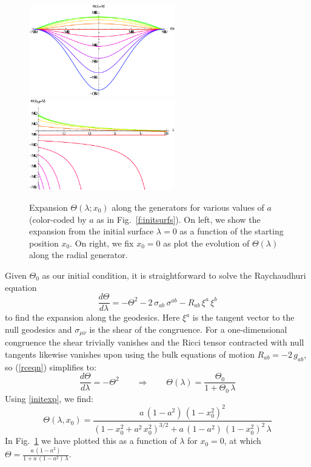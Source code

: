 \documentclass[12pt]{article}
\begin{document}
\begin{figure}
\begin{center}
\includegraphics[width=2.5in]{initexpofx}
\hspace{1cm}
\includegraphics[width=2.5in]{Theta_of_lambda}
\caption{
Expansion $\Theta(\lambda; x_0)$ along the generators for various values of $a$ (color-coded by $a$ as in Fig.~\ref{f:initsurfs}).
On left, we show the expansion from the initial surface $\lambda =0$ as a function of the starting position $x_0$.  On right, we fix $x_0=0$ as plot the evolution of $\Theta(\lambda)$ along the radial generator.
}
\label{f:expansion}
\end{center}
\end{figure}
% 

Given $\Theta_0$ as our initial condition, it is straightforward to solve the Raychaudhuri equation
%
\begin{equation}
\frac{d\Theta}{d\lambda} = -\Theta^2 -2\,\sigma_{ab}\, \sigma^{ab} - R_{ab} \,\xi^a\, \xi^b
\label{rceqn}
\end{equation}	
%
to find the expansion along the geodesics. Here $\xi^a$ is the tangent vector to the null geodesics and $\sigma_{\mu\nu} $ is the shear of the congruence. For a one-dimensional congruence the shear  trivially vanishes and the Ricci tensor contracted with null tangents likewise vanishes upon using the bulk equations of motion  $R_{ab} = -2 \, g_{ab}$, so (\ref{rceqn}) simplifies to:
%
\begin{equation}
\frac{d \Theta}{d\lambda} = - \Theta^2 
\qquad \Rightarrow \qquad
\Theta(\lambda) = \frac{\Theta_0}{1+ \Theta_0 \, \lambda}
\label{}
\end{equation}	
% 
Using \eqref{initexp}, we find:
%
\begin{equation}
\Theta(\lambda, x_0) = 
\frac{a \, (1-a^2) \, (1-x_0^2)^2}
{(1-x_0^2+a^2 \, x_0^2)^{3/2} + a \, (1-a^2) \, (1-x_0^2)^2 \, \lambda}
\label{ThetaEllipse}
\end{equation}	
%
In Fig.~\ref{f:expansion} we have plotted this as a function of $\lambda$ for $x_0 = 0$, at which  $\Theta = \frac{a \, (1-a^2)}{1+ a \, (1-a^2) \, \lambda}$.
\end{document}
